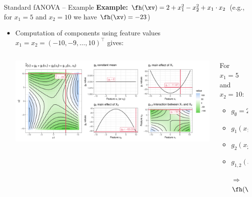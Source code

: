 \documentclass[11pt,compress,t,notes=noshow, aspectratio=169, xcolor=table]{beamer}
\newcommand{\open}{}
\newcommand{\close}{}
\begin{document}
\begin{frame}{Standard fANOVA -- Example}
\textbf{Example:} $\fh(\xv) = 2 + x_1^2 - x_2^2 + x_1 \cdot x_2$ (e.g., for $x_1 = 5$ and $x_2 = 10$ we have $\fh(\xv) = -23$)

\begin{itemize}
    \item Computation of components using feature values $x_1 = x_2 = (-10, -9, \ldots, 10)^\top$ gives:
    \begin{columns}[c, totalwidth=\linewidth]
    \begin{column}{0.75\textwidth}
        \includegraphics[width = \textwidth]{figure/decomposition}
    \end{column}
    \begin{column}{0.25\textwidth}
    For $x_1 = 5$ and $x_2 = 10$:\\
    \begin{itemize}
        \item $g_{\open \emptyset \close} = 2$
        \item $g_{\open 1 \close}(x_1) = -9.67$
        \item $g_{\open 2 \close}(x_2) = -65.33$
        \item $g_{\open 1,2 \close}(x_1, x_2) = 50$
        \item[$\Rightarrow$] $\fh(\xv) = -23$
    \end{itemize}
    \end{column}
    \end{columns}
\end{itemize} 
\end{frame}
\end{document}
